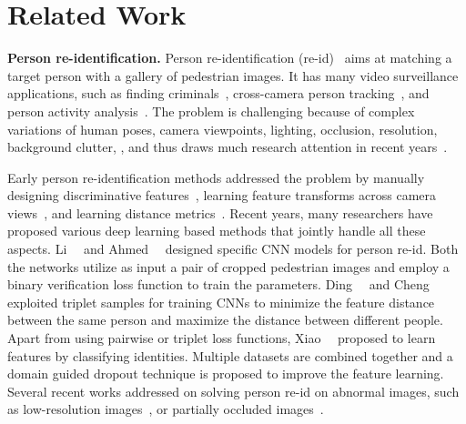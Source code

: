 \section{Related Work} %
\label{sec:ps-related-work}
\textbf{Person re-identification.} Person re-identification (re-id)~\cite{zajdel2005keeping,gheissari2006person} aims at matching a target person with a gallery of pedestrian images. It has many video surveillance applications, such as finding criminals~\cite{wang2013intelligent}, cross-camera person tracking~\cite{yu2013harry}, and person activity analysis~\cite{loy2009multi}. The problem is challenging because of complex variations of human poses, camera viewpoints, lighting, occlusion, resolution, background clutter, \etc, and thus draws much research attention in recent years~\cite{zheng2015scalable,liao2015person,paisitkriangkrai2015learning,xiao2016learning,li2014deepreid,chu2016structured}.

Early person re-identification methods addressed the problem by manually designing discriminative features~\cite{wang2007shape,hamdoun2008person,zhao2013unsupervised}, learning feature transforms across camera views~\cite{prosser2010person,porikli2003inter,shen2015person}, and learning distance metrics~\cite{zheng2011person,gray2008viewpoint,prosser2010person,paisitkriangkrai2015learning,liao2015efficient}. Recent years, many researchers have proposed various deep learning based methods that jointly handle all these aspects. Li~\etal~\cite{li2014deepreid} and Ahmed~\etal~\cite{ahmed2015improved} designed specific CNN models for person re-id. Both the networks utilize as input a pair of cropped pedestrian images and employ a binary verification loss function to train the parameters. Ding~\etal~\cite{ding2015deep} and Cheng~\etal~\cite{cheng2016person} exploited triplet samples for training CNNs to minimize the feature distance between the same person and maximize the distance between different people. Apart from using pairwise or triplet loss functions, Xiao~\etal~\cite{xiao2016learning} proposed to learn features by classifying identities. Multiple datasets are combined together and a domain guided dropout technique is proposed to improve the feature learning. Several recent works addressed on solving person re-id on abnormal images, such as low-resolution images~\cite{li2015multi}, or partially occluded images~\cite{zheng2015partial}.

